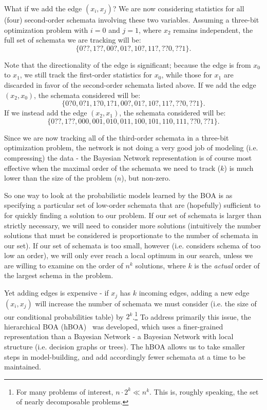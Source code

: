 \documentclass[letterpaper]{article}
\begin{document}
What if we add the edge $(x_i,x_j)$? We are now considering statistics
for all (four) second-order schemata involving these two variables. Assuming a
three-bit optimization problem with $i=0$ and $j=1$, where $x_2$ remains
independent, the full set of schemata we are tracking will be:
\begin{equation}
  \{0??, 1??, 00?, 01?, 10?, 11?, ??0, ??1\} .
\end{equation}

Note that the directionality of the edge is significant; because the edge is
from $x_0$ to $x_1$, we still track the first-order statistics for $x_0$, while
those for $x_1$ are discarded in favor of the second-order schemata listed
above. If we add the edge $(x_2,x_0)$, the schemata considered will be:
\begin{equation}
  \{0?0, 0?1, 1?0, 1?1, 00?, 01?, 10?, 11?, ??0, ??1\}.
\end{equation}
If we instead add the edge $(x_2,x_1)$, the schemata considered will be:
\begin{equation}
  \{0??, 1??, 000, 001, 010, 011, 100, 101, 110, 111, ??0, ??1\}.
\end{equation}

Since we are now tracking all of the third-order schemata in a three-bit
optimization problem, the network is not doing a very good job of modeling
(i.e. compressing) the data - the Bayesian Network representation is of course
most effective when the maximal order of the schemata we need to track ($k$) is
much lower than the size of the problem ($n$), but non-zero.

So one way to look at the probabilistic models learned by the BOA is as
specifying a particular set of low-order schemata that are (hopefully)
sufficient to for quickly finding a solution to our problem. If our set of
schemata is larger than strictly necessary, we will need to consider more
solutions (intuitively the number solutions that must be considered is
proportionate to the number of schemata in our set). If our set of schemata is
too small, however (i.e. considers schema of too low an order), we will only
ever reach a local optimum in our search, unless we are willing to examine on
the order of $n^k$ solutions, where $k$ is the \emph{actual} order of the
largest schema in the problem.

Yet adding edges is expensive - if $x_j$ has $k$ incoming edges, adding a new
edge $(x_i,x_j)$ will increase the number of schemata we must consider
(i.e. the size of our conditional probabilities table) by $2^k$.\footnote{For
  many problems of interest, $n \cdot 2^k \ll n^k$. This is, roughly speaking,
  the set of nearly decomposable problems.} To address primarily this issue,
the hierarchical BOA (hBOA)~\cite{hBOA} was developed, which uses a
finer-grained representation than a Bayesian Network - a Bayesian Network with
local structure (i.e. decision graphs or trees). The hBOA allows us to take
smaller steps in model-building, and add accordingly fewer schemata at a time
to be maintained.
\end{document}
